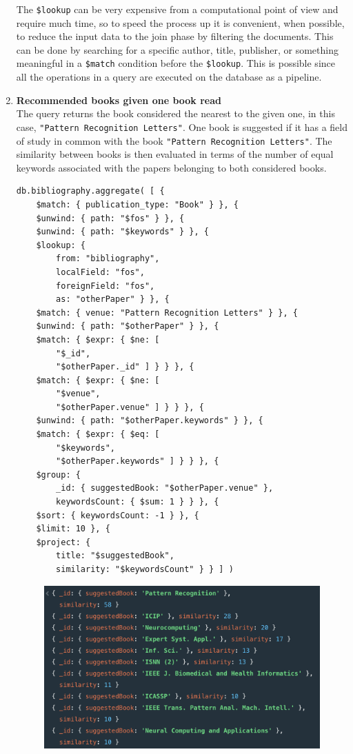 \begin{enumerate}
\begin{figure}[H]
\begin{center}
            \label{fig:query9mongodb}%
        \end{center}
    \end{figure}
    The \verb|$lookup| can be very expensive from a computational point of view and require much time, so to speed the process up it is convenient, when possible, to reduce the input data to the join phase by filtering the documents.
    This can be done by searching for a specific author, title, publisher, or something meaningful in a \verb|$match| condition before the \verb|$lookup|.
    This is possible since all the operations in a query are executed on the database as a pipeline.
    \item \textbf{Recommended books given one book read} \\
    The query returns the book considered the nearest to the given one, in this case, \verb|"Pattern Recognition Letters"|.
    One book is suggested if it has a field of study in common with the book \verb|"Pattern Recognition Letters"|.
    The similarity between books is then evaluated in terms of the number of equal keywords associated with the papers belonging to both considered books.
    \begin{lstlisting}[label={lst:query10mongodb}]
db.bibliography.aggregate( [ {
    $match: { publication_type: "Book" } }, {
    $unwind: { path: "$fos" } }, {
    $unwind: { path: "$keywords" } }, {
    $lookup: {
        from: "bibliography",
        localField: "fos",
        foreignField: "fos",
        as: "otherPaper" } }, {
    $match: { venue: "Pattern Recognition Letters" } }, {
    $unwind: { path: "$otherPaper" } }, {
    $match: { $expr: { $ne: [
        "$_id",
        "$otherPaper._id" ] } } }, {
    $match: { $expr: { $ne: [
        "$venue",
        "$otherPaper.venue" ] } } }, {
    $unwind: { path: "$otherPaper.keywords" } }, {
    $match: { $expr: { $eq: [
        "$keywords",
        "$otherPaper.keywords" ] } } }, {
    $group: {
        _id: { suggestedBook: "$otherPaper.venue" },
        keywordsCount: { $sum: 1 } } }, {
    $sort: { keywordsCount: -1 } }, {
    $limit: 10 }, {
    $project: {
        title: "$suggestedBook",
        similarity: "$keywordsCount" } } ] )
    \end{lstlisting}
    \begin{figure}[H]
        \begin{center}
            \includegraphics[width=0.9\linewidth]{ImagesMongoDB/query10mongodb}

\end{center}
\end{figure}
\end{enumerate}
